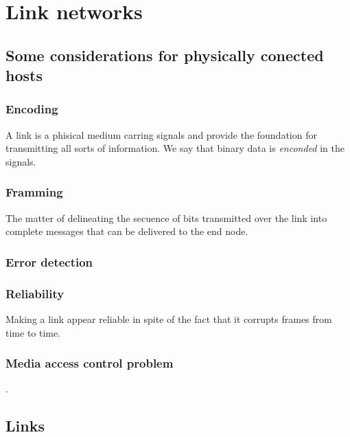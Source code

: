 \section{Link networks}

\subsection{Some considerations for physically conected hosts}

	\subsubsection{Encoding}
		A link is a phisical medium carring signals and provide the foundation for
		transmitting all sorts of information. We say that binary data is
		\emph{enconded} in the signals. \cite[pp. 68]{PetersonDavie:2003}
	\subsubsection{Framming}
		The matter of delineating the secuence of bits transmitted over the link into
		complete messages that can be delivered to the end node. 
	\subsubsection{Error detection}

	\subsubsection{Reliability}
		Making a link appear reliable in spite of the fact that it
		corrupts frames from time to time.
	\subsubsection{Media access control problem}
			   
	\cite[pp. 64]{PetersonDavie:2003}.

\subsection{Links}
